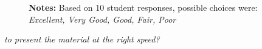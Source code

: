 \begin{boenumerate}
\begin{itemize}
\begin{figure}[h!]\centering
{}\hspace{0.5cm}
\begin{center}
\begin{minipage}[t]{0.85\columnwidth}\vspace{-0.75cm}
\item\scriptsize{\textbf{Notes:} Based on 10 student responses, possible choices were: \emph{Excellent, Very Good, Good, Fair, Poor} }
\end{minipage}
\end{center}
\end{figure}
\FloatBarrier
\newpage
\item \textit{to present the material at the right speed?}


\end{itemize}
\end{boenumerate}
